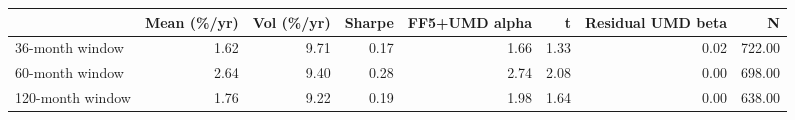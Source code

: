 \begin{tabular}{lrrrrrrr}
\toprule
 & Mean (\%/yr) & Vol (\%/yr) & Sharpe & FF5+UMD alpha & t & Residual UMD beta & N \\
\midrule
36-month window & 1.62 & 9.71 & 0.17 & 1.66 & 1.33 & 0.02 & 722.00 \\
60-month window & 2.64 & 9.40 & 0.28 & 2.74 & 2.08 & 0.00 & 698.00 \\
120-month window & 1.76 & 9.22 & 0.19 & 1.98 & 1.64 & 0.00 & 638.00 \\
\bottomrule
\end{tabular}
